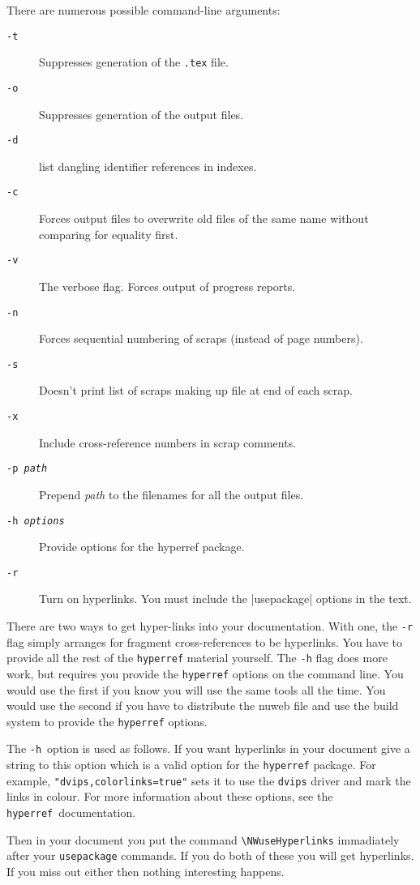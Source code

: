 \documentclass[a4paper]{report}
\begin{document}
There are numerous possible command-line arguments:
\begin{description}
\item[\tt -t] Suppresses generation of the {\tt .tex} file.
\item[\tt -o] Suppresses generation of the output files.
\item[\tt -d] list dangling identifier references in indexes.
\item[\tt -c] Forces output files to overwrite old files of the same
  name without comparing for equality first.
\item[\tt -v] The verbose flag. Forces output of progress reports.
\item[\tt -n] Forces sequential numbering of scraps (instead of page
  numbers).
\item[\tt -s] Doesn't print list of scraps making up file at end of
  each scrap.
\item[\tt -x] Include cross-reference numbers in scrap comments.
\item[\tt -p \it path] Prepend \textit{path} to the filenames for
all the output files.
\item[\tt -h \it options] Provide options for the hyperref
package.
\item[\tt -r] Turn on hyperlinks. You must include the |usepackage|
options in the text.
\end{description}

There are two ways to get hyper-links into your documentation. With
one, the \texttt{-r} flag simply arranges for fragment
cross-references to be hyperlinks. You have to provide all the rest of
the \texttt{hyperref} material yourself. The \texttt{-h} flag does
more work, but requires you provide the \texttt{hyperref} options on
the command line. You would use the first if you know you will use the
same tools all the time. You would use the second if you have to
distribute the nuweb file and use the build system to provide the
\texttt{hyperref} options.

The \texttt{-h}\ option is used as follows. If you want
hyperlinks in your document give a string to this option which is
a valid option for the \texttt{hyperref} package. For example,
\verb|"dvips,colorlinks=true"| sets it to use the
\texttt{dvips} driver and mark the links in colour. For more
information about these options, see the \texttt{hyperref}\
documentation.

Then in your document you put the command \verb|\NWuseHyperlinks|
immadiately after your \verb|usepackage| commands. If you do both
of these you will get hyperlinks. If you miss out either then
nothing interesting happens.
\end{document}

